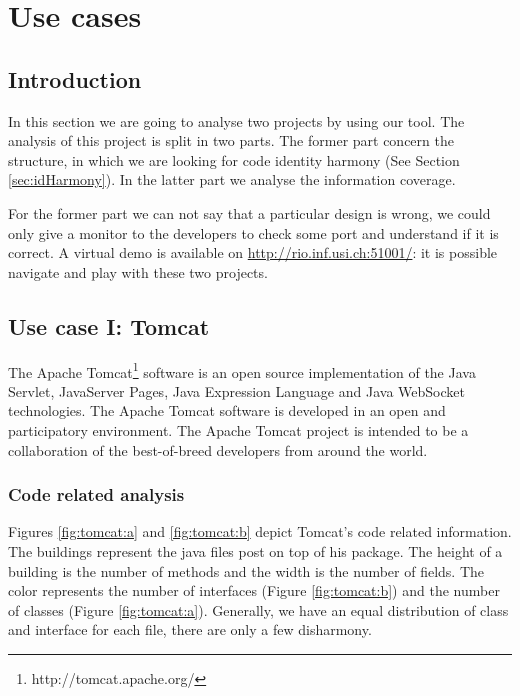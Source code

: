 \documentclass[]{usiinfbachelorproject}
\begin{document}
   





\newpage

\section{Use cases} \label{evaluation}

\subsection{Introduction}
In this section we are going to analyse two projects by using our tool. 
The analysis of this project is split in two parts. The former part concern the structure, in which we are looking for code identity harmony (See Section \ref{sec:idHarmony}). In the latter part we analyse the information coverage. 

For the former part we can not say that a particular design is wrong, we could only give a monitor to the developers to check some port and understand if it is correct.
A virtual demo is available on \url{http://rio.inf.usi.ch:51001/}: it is possible navigate and play with these two projects. 

\subsection{Use case I: Tomcat}
The Apache Tomcat\footnote{http://tomcat.apache.org/} software is an open source implementation of the Java Servlet, JavaServer Pages, Java Expression Language and Java WebSocket technologies. 
The Apache Tomcat software is developed in an open and participatory environment. The Apache Tomcat project is intended to be a collaboration of the best-of-breed developers from around the world.

\subsubsection{Code related analysis}

Figures \ref{fig:tomcat:a} and \ref{fig:tomcat:b}  depict Tomcat's code related information. The buildings represent the java files post on top of his package. The height of a building is the number of methods and the width is the number of fields. The color represents the number of interfaces (Figure \ref{fig:tomcat:b}) and  the number of classes (Figure  \ref{fig:tomcat:a}).
Generally, we have an equal distribution of class and interface for each file, there are only a few disharmony.
\end{document}
